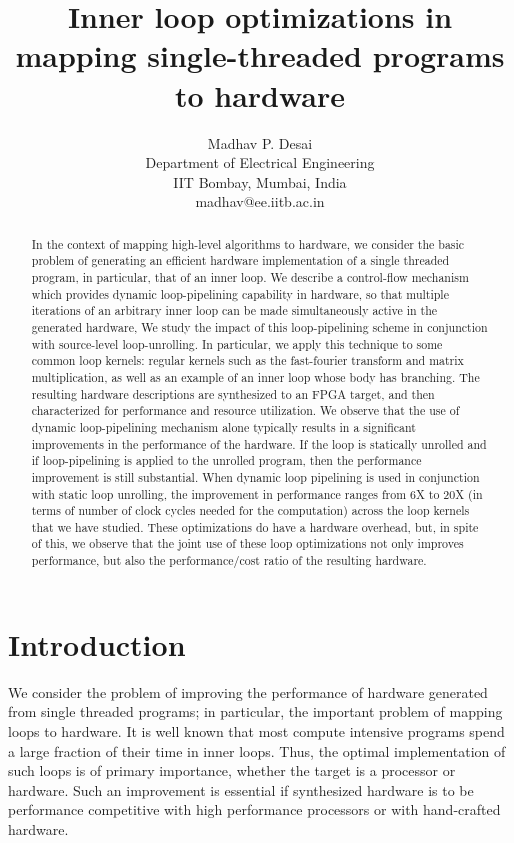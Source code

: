 \documentclass[conference]{IEEEtran}
\title{Inner loop optimizations in mapping single-threaded programs to hardware}
\author{Madhav P. Desai\\ Department of Electrical Engineering\\ IIT Bombay, Mumbai, India\\ madhav@ee.iitb.ac.in}
\begin{document}
\maketitle
\thispagestyle{empty}

\begin{abstract}

  In the context of mapping high-level algorithms to hardware,
  we consider the basic problem of generating an efficient hardware 
  implementation of a single threaded program, in particular, that
  of an inner loop.  
  We describe a control-flow mechanism which provides dynamic loop-pipelining
  capability in hardware, so that multiple iterations of an arbitrary inner loop 
  can be made simultaneously active in the generated hardware, 
  We study the impact of this loop-pipelining scheme in conjunction with
  source-level loop-unrolling.  
  In particular, we apply this technique to some common loop kernels: regular kernels
  such as the  fast-fourier transform and matrix multiplication, as well
  as an example of an inner loop whose body has branching.
  The resulting hardware descriptions are synthesized to an FPGA target,
  and then characterized for performance and resource utilization.  
  We observe
  that the use of dynamic loop-pipelining mechanism alone typically results in
  a significant improvements in the performance of the hardware.  
  If the loop is
  statically unrolled and if loop-pipelining is applied to the unrolled
  program, then the performance improvement is still substantial.  
  When dynamic loop pipelining is used in conjunction with static loop unrolling, the improvement in performance
  ranges from 6X to 20X (in terms of number of clock cycles needed for the computation)
  across the loop kernels that we have studied.
  These optimizations do have a hardware overhead, but,
  in spite of this, we observe that the joint use of these 
  loop optimizations not only improves performance, but also the 
  performance/cost ratio of the resulting hardware.
 

\end{abstract}

\section{Introduction}

We consider the problem of improving the performance
of hardware generated from single threaded programs; in
particular, the important problem of mapping loops to hardware.  It
is well known that most compute intensive programs spend a large fraction
of their time in inner loops.  Thus, the optimal implementation
of such loops is of primary importance, whether the target is
a processor or hardware.  Such an improvement is essential if
synthesized hardware is to be performance competitive with
high performance processors or with hand-crafted hardware.
\end{document}
